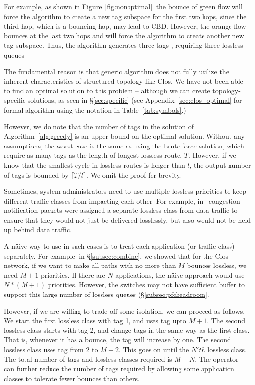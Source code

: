 For example, as shown in Figure~\ref{fig:nonoptimal}, the bounce of green flow
will force the algorithm to create a new tag subspace for the first two hops,
since the third hop, which is a bouncing hop, may lead to CBD.  However, the
orange flow bounces at the last two hops and will force the algorithm to create
another new tag subspace. Thus, the algorithm generates three tags , requiring
three lossless queues.

The fundamental reason is that generic algorithm does not fully utilize the
inherent characteristics of structured topology like Clos. We have not been able
to find an optimal solution to this problem -- although we can create
topology-specific solutions, as seen in \S\ref{sec:specific} (see
Appendix~\ref{sec:clos_optimal} for formal algorithm using the notation in
Table~\ref{tab:symbols}.)

However, we do note that the number of tags in the solution of
Algorithm~\ref{alg:greedy} is an upper bound on the optimal solution.  Without
any assumptions, the worst case is the same as using the brute-force solution,
which require as many tags as the length of longest lossless route, $T$.
However, if we know that the smallest cycle in lossless routes is longer than
$l$, the output number of tags is bounded by $\lceil T/l \rceil$. We omit the
proof for brevity.

 Sometimes, system administrators need to
use multiple lossless priorities to keep different traffic classes from impacting each
other. For example, in~\cite{dcqcn} congestion notification packets were
assigned a separate lossless class from data traffic to ensure that they would
not just be delivered losslessly, but also would not be held up behind data
traffic.

A n{\"a}ive way to use \sysname{} in such cases is to treat each application (or
traffic class) separately.  For example, in \S\ref{subsec:combine}, we showed
that for the Clos network, if we want to make  all paths with no more than $M$
bounces lossless, we need $M+1$ priorities. If there are $N$ applications, the
n{\"a}ive approach would use $N*(M+1)$ priorities.  However, the switches may
not have sufficient buffer to support this large number of lossless queues
(\S\ref{subsec:pfcheadroom}.

However, if we are willing to trade off some isolation, we can proceed as
follows.  We start the first lossless class with tag 1, and uses tag upto $M+1$.
The second lossless class starts with tag 2, and change tags in the same way as
the first class.  That is, whenever it has a bounce, the tag will increase by
one. The second lossless class uses tag from 2 to $M+2$. This goes on until the
$N'th$ lossless class. The total number of tags and lossless classes required is
$M + N$. The operator can further reduce the number of tags required by allowing
some application classes to tolerate fewer bounces than others.

